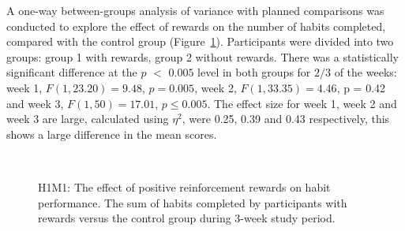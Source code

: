 A one-way between-groups analysis of variance with planned comparisons was conducted to explore the effect of rewards on the number of habits completed, compared with the control group (Figure~\ref{fig:m1_h1}). Participants were divided into two groups: group 1 with rewards, group 2 without rewards. There was a statistically significant difference at the $p$ $<$ $0.005$ level in both groups for $2$$/$$3$ of the weeks: week 1, $F(1,23.20) = 9.48$, $p = 0.005$, week 2, $F(1,33.35) = 4.46$, p = 0.42 and week 3, $F(1,50) = 17.01$, $p\leq 0.005$. The effect size for week 1, week 2 and week 3 are large, calculated using $\eta^{2}$, were 0.25, 0.39 and 0.43 respectively, this shows a large difference in the mean scores.

\begin{figure}[H]
\centering
  \caption{H1M1: The effect of positive reinforcement rewards on habit performance. The sum of habits completed by participants with rewards versus the control group during 3-week study period.}~\label{fig:m1_h1}
\end{figure}

